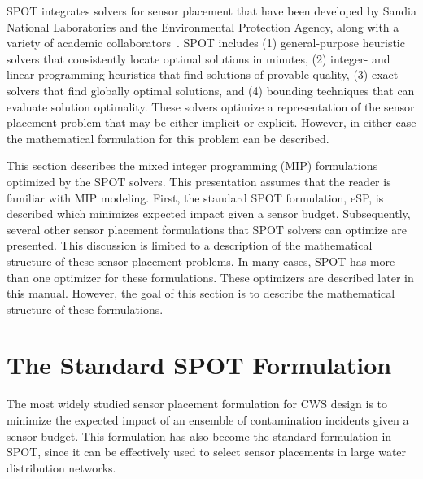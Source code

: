 
SPOT integrates solvers for sensor placement that have been developed by Sandia National Laboratories and the Environmental Protection Agency, along with a variety of academic collaborators~\cite{MurUbeJan06,MurBerHar06,CarGreHarKonLauLinMorPhi06,HarBerMurPhiRieWat07,BerHarPhiUbeWat06,BerFleHarPhiWat05}.
SPOT includes (1) general-\/purpose heuristic solvers that
consistently locate optimal solutions in minutes, (2) integer-\/ and
linear-\/programming heuristics that find solutions of provable quality,
(3) exact solvers that find globally optimal solutions, and (4) bounding
techniques that can evaluate solution optimality. These solvers optimize
a representation of the sensor placement problem that may be either
implicit or explicit. However, in either case the mathematical formulation for this problem can be described.

This section describes the mixed integer programming (MIP) formulations optimized by the SPOT solvers. This presentation assumes that the reader is familiar with MIP modeling. First, the standard SPOT formulation, eSP, is described which minimizes expected impact given a sensor budget. Subsequently, several other sensor placement formulations that SPOT solvers can optimize are presented. This discussion is limited to a description of the mathematical structure of these sensor placement problems. In many cases, SPOT has more than one optimizer for these formulations. These optimizers are described later in this manual. However, the goal of this section is to describe the mathematical structure of these formulations.

\section{The Standard SPOT Formulation}\label{formulations_formulationsCanonical}

The most widely studied sensor placement formulation for CWS design is to minimize the expected impact of an ensemble of contamination incidents given a sensor budget. This formulation has also become the standard formulation in SPOT, since it can be effectively used to select sensor placements in large water distribution networks.

